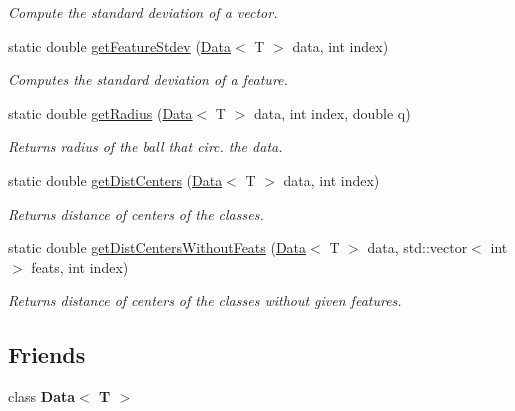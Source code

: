 \begin{DoxyCompactItemize}
\begin{DoxyCompactList}\small\item\em Compute the standard deviation of a vector. \end{DoxyCompactList}\item 
static double \mbox{\hyperlink{class_statistics_abc9b84947508360382100784f43d2b25}{get\+Feature\+Stdev}} (\mbox{\hyperlink{class_data}{Data}}$<$ T $>$ data, int index)
\begin{DoxyCompactList}\small\item\em Computes the standard deviation of a feature. \end{DoxyCompactList}\item 
static double \mbox{\hyperlink{class_statistics_a157fcc6f57bed7b0b353bff8145c5964}{get\+Radius}} (\mbox{\hyperlink{class_data}{Data}}$<$ T $>$ data, int index, double q)
\begin{DoxyCompactList}\small\item\em Returns radius of the ball that circ. the data. \end{DoxyCompactList}\item 
static double \mbox{\hyperlink{class_statistics_ac7673aaf51acf57cfc240cb213f4b30f}{get\+Dist\+Centers}} (\mbox{\hyperlink{class_data}{Data}}$<$ T $>$ data, int index)
\begin{DoxyCompactList}\small\item\em Returns distance of centers of the classes. \end{DoxyCompactList}\item 
static double \mbox{\hyperlink{class_statistics_a781ebfca723e5c57db495635225363e6}{get\+Dist\+Centers\+Without\+Feats}} (\mbox{\hyperlink{class_data}{Data}}$<$ T $>$ data, std\+::vector$<$ int $>$ feats, int index)
\begin{DoxyCompactList}\small\item\em Returns distance of centers of the classes without given features. \end{DoxyCompactList}\end{DoxyCompactItemize}
\subsection*{Friends}
\begin{DoxyCompactItemize}
\item 
\mbox{\label{class_statistics_a51b30b6248fac4c53524437ace868c08}} 
class {\bfseries Data$<$ T $>$}
\end{DoxyCompactItemize}


